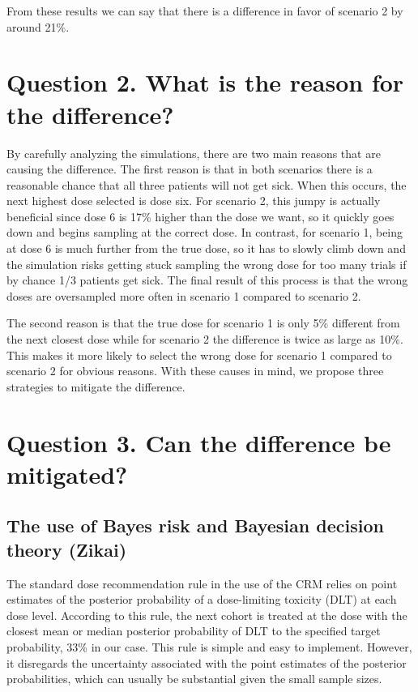 \documentclass[
]{article}
\begin{document}
From these results we can say that there is a difference in favor of
scenario 2 by around 21\%.

\hypertarget{question-2.-what-is-the-reason-for-the-difference}{%
\section{Question 2. What is the reason for the
difference?}\label{question-2.-what-is-the-reason-for-the-difference}}

By carefully analyzing the simulations, there are two main reasons that
are causing the difference. The first reason is that in both scenarios
there is a reasonable chance that all three patients will not get sick.
When this occurs, the next highest dose selected is dose six. For
scenario 2, this jumpy is actually beneficial since dose 6 is 17\%
higher than the dose we want, so it quickly goes down and begins
sampling at the correct dose. In contrast, for scenario 1, being at dose
6 is much further from the true dose, so it has to slowly climb down and
the simulation risks getting stuck sampling the wrong dose for too many
trials if by chance 1/3 patients get sick. The final result of this
process is that the wrong doses are oversampled more often in scenario 1
compared to scenario 2.

The second reason is that the true dose for scenario 1 is only 5\%
different from the next closest dose while for scenario 2 the difference
is twice as large as 10\%. This makes it more likely to select the wrong
dose for scenario 1 compared to scenario 2 for obvious reasons. With
these causes in mind, we propose three strategies to mitigate the
difference.

\hypertarget{question-3.-can-the-difference-be-mitigated}{%
\section{Question 3. Can the difference be
mitigated?}\label{question-3.-can-the-difference-be-mitigated}}

\hypertarget{the-use-of-bayes-risk-and-bayesian-decision-theory-zikai}{%
\subsection{The use of Bayes risk and Bayesian decision theory
(Zikai)}\label{the-use-of-bayes-risk-and-bayesian-decision-theory-zikai}}

The standard dose recommendation rule in the use of the CRM relies on
point estimates of the posterior probability of a dose-limiting toxicity
(DLT) at each dose level. According to this rule, the next cohort is
treated at the dose with the closest mean or median posterior
probability of DLT to the specified target probability, 33\% in our
case. This rule is simple and easy to implement. However, it disregards
the uncertainty associated with the point estimates of the posterior
probabilities, which can usually be substantial given the small sample
sizes.
\end{document}
